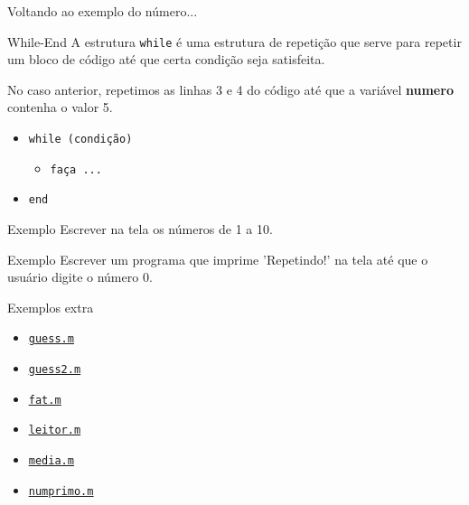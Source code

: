 \documentclass[hyperref={pdfpagelabels=false}]{beamer}
\begin{document}
\begin{frame}{Voltando ao exemplo do número...}
  
\end{frame}

\begin{frame}{While-End}
  A estrutura {\texttt{while}} é uma estrutura de \alert{repetição} que serve para repetir um bloco de código até que certa condição seja satisfeita.

  No caso anterior, repetimos as linhas 3 e 4 do código até que a variável \textbf{numero} contenha o valor 5.

  \begin{itemize}
  \item[] {\texttt{while (condição)}}
    \begin{itemize}
    \item[] {\texttt{faça ...}}
    \end{itemize}
  \item[] {\texttt{end}}
  \end{itemize}
\end{frame}

\begin{frame}{Exemplo}
  Escrever na tela os números de 1 a 10.
  
\end{frame}

\begin{frame}{Exemplo}
  Escrever um programa que imprime 'Repetindo!' na tela até que o usuário digite o número 0.
\end{frame}

\begin{frame}{Exemplos extra}
  \begin{itemize}
  \item \href{listings/guess.m}{\underline{\texttt{guess.m}}}
  \item \href{listings/guess2.m}{\underline{\texttt{guess2.m}}}
  \item \href{listings/fat.m}{\underline{\texttt{fat.m}}}
  \item \href{listings/leitor.m}{\underline{\texttt{leitor.m}}}
  \item \href{listings/media.m}{\underline{\texttt{media.m}}}
  \item \href{listings/numprimo.m}{\underline{\texttt{numprimo.m}}}
  \end{itemize}
\end{frame}
\end{document}
